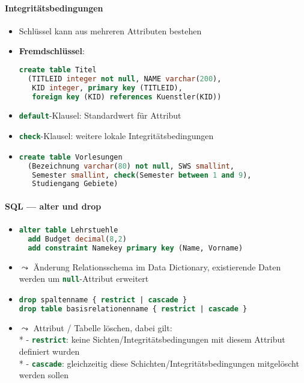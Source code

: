 \paragraph{Integritätsbedingungen}
\begin{itemize}
	\item Schlüssel kann aus mehreren Attributen bestehen
	\item \textbf{Fremdschlüssel}: \begin{lstlisting}[language=sql]
create table Titel
  (TITLEID integer not null, NAME varchar(200), 
   KID integer, primary key (TITLEID), 
   foreign key (KID) references Kuenstler(KID))
\end{lstlisting}
	\item \lstinline[language=sql]{default}-Klausel: Standardwert für Attribut
	\item \lstinline[language=sql]{check}-Klausel: weitere lokale Integritätsbedingungen
	\item \begin{lstlisting}[language=sql]
create table Vorlesungen
  (Bezeichnung varchar(80) not null, SWS smallint,
   Semester smallint, check(Semester between 1 and 9), 
   Studiengang Gebiete)
\end{lstlisting}
\end{itemize}



\paragraph{SQL --- alter und drop}
\begin{itemize}
	\item \begin{lstlisting}[language=sql]
alter table Lehrstuehle
  add Budget decimal(8,2)
  add constraint Namekey primary key (Name, Vorname)
\end{lstlisting}
	\item \( \leadsto \) Änderung Relationsschema im Data Dictionary, existierende Daten werden um \lstinline[language=sql]{null}-Attribut erweitert
	\item \begin{lstlisting}[language=sql]
drop spaltenname { restrict | cascade }
drop table basisrelationenname { restrict | cascade }
\end{lstlisting}
\item \( \leadsto \) Attribut / Tabelle löschen, dabei gilt: \\*
	- \lstinline[language=sql]{restrict}: keine Sichten/Integritätsbedingungen mit diesem Attribut definiert wurden \\*
	- \lstinline[language=sql]{cascade}: gleichzeitig diese Schichten/Integritätsbedingungen mitgelöscht werden sollen
\end{itemize}

